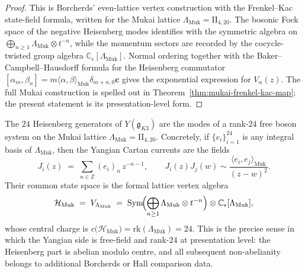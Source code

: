 \begin{proof}
This is Borcherds' even-lattice vertex construction with the
Frenkel--Kac state-field formula, written for the Mukai lattice
$\Lambda_{\mathrm{Muk}}=\mathrm{II}_{4,20}$. The bosonic Fock space of the
negative Heisenberg modes identifies with the symmetric algebra on
$\bigoplus_{n\geq 1}\Lambda_{\mathrm{Muk}}\otimes t^{-n}$, while the momentum sectors
are recorded by the cocycle-twisted group algebra
$\mathbb{C}_\epsilon[\Lambda_{\mathrm{Muk}}]$. Normal ordering together with the
Baker--Campbell--Hausdorff formula for the Heisenberg commutator
$[\alpha_m,\beta_n]
=m\langle\alpha,\beta\rangle_{\mathrm{Muk}}\delta_{m+n,0}\mathbf{c}$
gives the exponential expression for $V_\alpha(z)$. The full Mukai construction is
spelled out in Theorem~\ref{thm:mukai-frenkel-kac-map}; the present statement is its
presentation-level form.
\end{proof}

\begin{remark}
\label{rem:k3-24-heisenberg-lattice-voa}
The $24$ Heisenberg generators of $Y(\mathfrak{g}_{K3})$ are the modes of a rank-$24$
free boson system on the Mukai lattice
$\Lambda_{\mathrm{Muk}}=\mathrm{II}_{4,20}$. Concretely, if
$\{e_i\}_{i=1}^{24}$ is any integral basis of $\Lambda_{\mathrm{Muk}}$, then the
Yangian Cartan currents are the fields
\[
 J_i(z)
 \;=\;
 \sum_{n\in\mathbb{Z}} (e_i)_n\, z^{-n-1},
 \qquad
 J_i(z)J_j(w)
 \sim
 \frac{\langle e_i,e_j\rangle_{\mathrm{Muk}}}{(z-w)^2}.
\]
Their common state space is the formal lattice vertex algebra
\[
 \mathcal{H}_{\mathrm{Muk}}
 \;=\;
 V_{\Lambda_{\mathrm{Muk}}}
 \;=\;
 \mathrm{Sym}\!\Bigl(\bigoplus_{n\geq 1}\Lambda_{\mathrm{Muk}}\otimes t^{-n}\Bigr)
 \otimes \mathbb{C}_\epsilon[\Lambda_{\mathrm{Muk}}],
\]
whose central charge is
$c\bigl(\mathcal{H}_{\mathrm{Muk}}\bigr)=\mathrm{rk}(\Lambda_{\mathrm{Muk}})=24$.
This is the precise sense in which the Yangian side is free-field and rank-$24$ at
presentation level: the Heisenberg part is abelian modulo centre, and all subsequent
non-abelianity belongs to additional Borcherds or Hall comparison data.
\end{remark}

